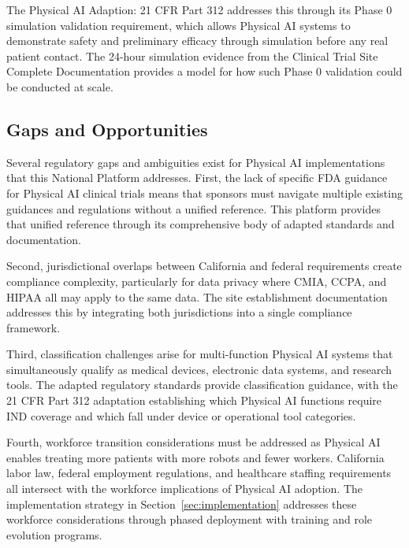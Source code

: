The Physical AI Adaption: 21 CFR Part 312 \cite{cfr312-adapt} addresses this
through its Phase 0 simulation validation requirement, which allows Physical
AI systems to demonstrate safety and preliminary efficacy through simulation
before any real patient contact. The 24-hour simulation evidence from the
Clinical Trial Site Complete Documentation \cite{site-docs} provides a model
for how such Phase 0 validation could be conducted at scale.

\subsection{Gaps and Opportunities}
\label{subsec:gaps-opportunities}

Several regulatory gaps and ambiguities exist for Physical AI implementations
that this National Platform addresses. First, the lack of specific FDA guidance
for Physical AI clinical trials means that sponsors must navigate multiple
existing guidances and regulations without a unified reference. This platform
provides that unified reference through its comprehensive body of adapted
standards and documentation.

Second, jurisdictional overlaps between California and federal requirements
create compliance complexity, particularly for data privacy where CMIA, CCPA,
and HIPAA all may apply to the same data. The site establishment documentation
\cite{site-docs} addresses this by integrating both jurisdictions into a single
compliance framework.

Third, classification challenges arise for multi-function Physical AI systems
that simultaneously qualify as medical devices, electronic data systems, and
research tools. The adapted regulatory standards provide classification
guidance, with the 21 CFR Part 312 adaptation \cite{cfr312-adapt} establishing
which Physical AI functions require IND coverage and which fall under device
or operational tool categories.

Fourth, workforce transition considerations must be addressed as Physical AI
enables treating more patients with more robots and fewer workers. California
labor law, federal employment regulations, and healthcare staffing requirements
all intersect with the workforce implications of Physical AI adoption. The
implementation strategy in Section~\ref{sec:implementation} addresses these
workforce considerations through phased deployment with training and role
evolution programs.

